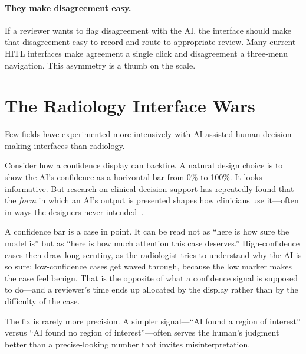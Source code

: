 \paragraph{They make disagreement easy.} If a reviewer wants to flag disagreement with the AI, the interface should make that disagreement easy to record and route to appropriate review. Many current HITL interfaces make agreement a single click and disagreement a three-menu navigation. This asymmetry is a thumb on the scale.

\section{The Radiology Interface Wars}
\label{sec:ch6-radiology}

Few fields have experimented more intensively with AI-assisted human decision-making interfaces than radiology.

Consider how a confidence display can backfire. A natural design choice is to show the AI's confidence as a horizontal bar from 0\% to 100\%. It looks informative. But research on clinical decision support has repeatedly found that the \emph{form} in which an AI's output is presented shapes how clinicians use it---often in ways the designers never intended~\autocite{bussone2015explanations}.

A confidence bar is a case in point. It can be read not as ``here is how sure the model is'' but as ``here is how much attention this case deserves.'' High-confidence cases then draw long scrutiny, as the radiologist tries to understand why the AI is so sure; low-confidence cases get waved through, because the low marker makes the case feel benign. That is the opposite of what a confidence signal is supposed to do---and a reviewer's time ends up allocated by the display rather than by the difficulty of the case.

The fix is rarely more precision. A simpler signal---``AI found a region of interest'' versus ``AI found no region of interest''---often serves the human's judgment better than a precise-looking number that invites misinterpretation.

